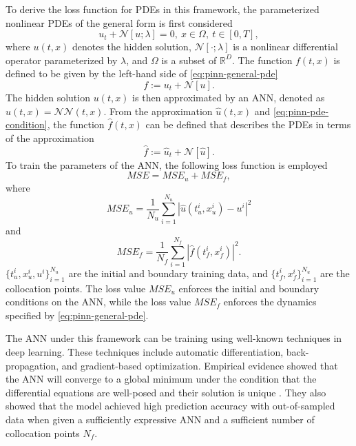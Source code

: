 To derive the loss function for \glspl{PDE} in this framework, the parameterized nonlinear \glspl{PDE} of the general form is first considered \cite{raissiPhysicsinformedNeuralNetworks2019}
\begin{equation}
    u_t + \mathcal{N}[u; \lambda] = 0,\ x \in \Omega,\ t \in [0, T],
    \label{eq:pinn-general-pde}
\end{equation}
where $u(t, x)$ denotes the hidden solution, $\mathcal{N}[\cdot; \lambda]$ is a nonlinear differential operator parameterized by $\lambda$, and $\Omega$ is a subset of $\mathbb{R}^D$.
The function $f(t, x)$ is defined to be given by the left-hand side of \autoref{eq:pinn-general-pde}
\begin{equation}
    f := u_t + \mathcal{N}[u].
    \label{eq:pinn-pde-condition}
\end{equation}
The hidden solution $u(t, x)$ is then approximated by an \gls{ANN}, denoted as $\hat{u}(t, x) = \mathcal{NN}(t, x)$.
From the approximation $\hat{u}(t, x)$ and \autoref{eq:pinn-pde-condition}, the function $\hat{f}(t, x)$ can be defined that describes the \glspl{PDE} in terms of the approximation
\begin{equation}
    \hat{f} := \hat{u}_t + \mathcal{N}[\hat{u}].
\end{equation}
To train the parameters of the \gls{ANN}, the following loss function is employed \cite{raissiPhysicsinformedNeuralNetworks2019}
\begin{equation}
    MSE = MSE_u + MSE_f,
\end{equation}
where
\begin{equation}
    MSE_u = \frac{1}{N_u} \sum_{i=1}^{N_u} |\hat{u}(t_u^i, x_u^i) - u^i|^2
\end{equation}
and
\begin{equation}
    MSE_f = \frac{1}{N_f} \sum_{i=1}^{N_f} |\hat{f}(t_f^i, x_f^i)|^2.
\end{equation}
$\{t_u^i, x_u^i, u^i\}_{i=1}^{N_u}$ are the initial and boundary training data, and $\{t_f^i, x_f^i\}_{i=1}^{N_u}$ are the collocation points.
The loss value $MSE_u$ enforces the initial and boundary conditions on the \gls{ANN}, while the loss value $MSE_f$ enforces the dynamics specified by \autoref{eq:pinn-general-pde}.

The \gls{ANN} under this framework can be training using well-known techniques in deep learning.
These techniques include automatic differentiation, back-propagation, and gradient-based optimization.
Empirical evidence showed that the \gls{ANN} will converge to a global minimum under the condition that the differential equations are well-posed and their solution is unique \cite{raissiPhysicsinformedNeuralNetworks2019}.
They also showed that the model achieved high prediction accuracy with out-of-sampled data when given a sufficiently expressive \gls{ANN} and a sufficient number of collocation points $N_f$.